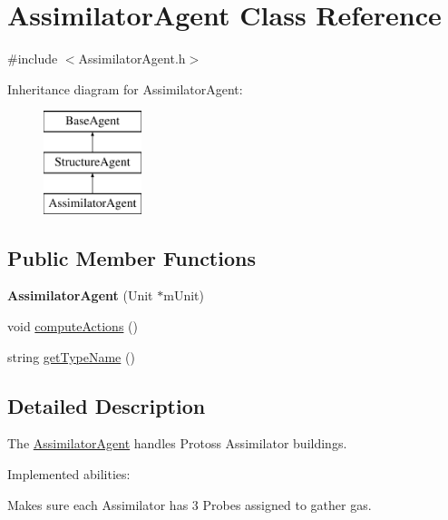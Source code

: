 \hypertarget{class_assimilator_agent}{
\section{AssimilatorAgent Class Reference}
\label{class_assimilator_agent}
}


{\ttfamily \#include $<$AssimilatorAgent.h$>$}

Inheritance diagram for AssimilatorAgent:\begin{figure}[H]
\begin{center}
\leavevmode
\includegraphics[height=3.000000cm]{class_assimilator_agent}
\end{center}
\end{figure}
\subsection*{Public Member Functions}
\begin{DoxyCompactItemize}
\item 
\hypertarget{class_assimilator_agent_a80497d8d07e99f62034141e8b511726f}{
{\bfseries AssimilatorAgent} (Unit $\ast$mUnit)}
\label{class_assimilator_agent_a80497d8d07e99f62034141e8b511726f}

\item 
void \hyperlink{class_assimilator_agent_a845eb4fd817795a4c4e77733fa4dd7fb}{computeActions} ()
\item 
string \hyperlink{class_assimilator_agent_a22353f87b35febb6711ece6f3da5bd26}{getTypeName} ()
\end{DoxyCompactItemize}


\subsection{Detailed Description}
The \hyperlink{class_assimilator_agent}{AssimilatorAgent} handles Protoss Assimilator buildings.

Implemented abilities:
\begin{DoxyItemize}
\item Makes sure each Assimilator has 3 Probes assigned to gather gas.
\end{DoxyItemize}


